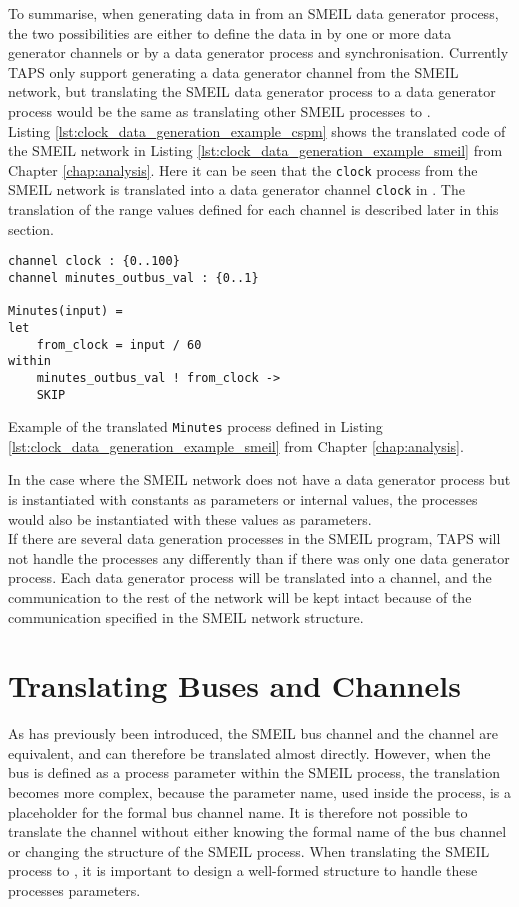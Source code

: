 To summarise, when generating data in \cspm{} from an SMEIL data generator process, the two possibilities are either to define the data in \cspm{} by one or more data generator channels or by a data generator process and synchronisation.
Currently TAPS only support generating a data generator channel from the SMEIL network, but translating the SMEIL data generator process to a \cspm{} data generator process would be the same as translating other SMEIL processes to \cspm{}.\\

Listing \ref{lst:clock_data_generation_example_cspm} shows the translated code of the SMEIL network in Listing \ref{lst:clock_data_generation_example_smeil} from Chapter \ref{chap:analysis}. Here it can be seen that the \texttt{clock} process from the SMEIL network is translated into a data generator channel \texttt{clock} in \cspm{}. The translation of the range values defined for each channel is described later in this section.
\begin{listing}
\begin{verbatim}
channel clock : {0..100}
channel minutes_outbus_val : {0..1}

Minutes(input) =
let
    from_clock = input / 60
within
    minutes_outbus_val ! from_clock ->
    SKIP

\end{verbatim}
\caption{Example of the translated \texttt{Minutes} process defined in Listing \ref{lst:clock_data_generation_example_smeil} from Chapter \ref{chap:analysis}.}
\label{lst:clock_data_generation_example_cspm}
\end{listing}
In the case where the SMEIL network does not have a data generator process but is instantiated with constants as parameters or internal values, the \cspm{} processes would also be instantiated with these values as parameters.\\

If there are several data generation processes in the SMEIL program, TAPS will not handle the processes any differently than if there was only one data generator process. Each data generator process will be translated into a \cspm{} channel, and the communication to the rest of the network will be kept intact because of the communication specified in the SMEIL network structure.

\section{Translating Buses and Channels}
As has previously been introduced, the SMEIL bus channel and the \cspm{} channel are equivalent, and can therefore be translated almost directly. However, when the bus is defined as a process parameter within the SMEIL process, the translation becomes more complex, because the parameter name, used inside the process, is a placeholder for the formal bus channel name. It is therefore not possible to translate the channel without either knowing the formal name of the bus channel or changing the structure of the SMEIL process.
When translating the SMEIL process to \cspm{}, it is important to design a well-formed structure to handle these processes parameters.\\

